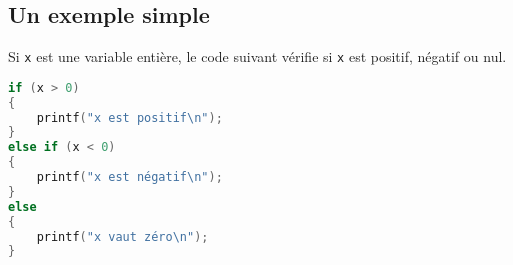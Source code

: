 \subsection{Un exemple simple}

Si \texttt{x} est une variable entière, le code suivant vérifie si \texttt{x} est positif, négatif ou nul.

\begin{lstlisting}[language=c]
if (x > 0)
{
    printf("x est positif\n");
}
else if (x < 0)
{
    printf("x est négatif\n");
}
else
{
    printf("x vaut zéro\n");
}
\end{lstlisting}